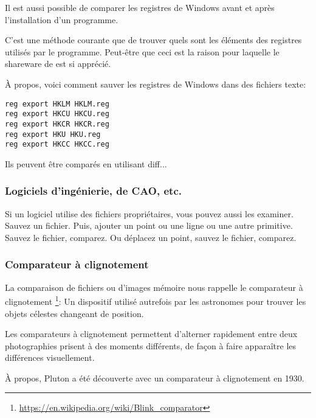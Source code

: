 Il est aussi possible de comparer les registres de Windows avant et après l'installation
d'un programme.

C'est une méthode courante  que de trouver quels sont les éléments des registres
utilisés par le programme. Peut-être que ceci est la raison pour laquelle le shareware
de  est si apprécié.

À propos, voici comment sauver les registres de Windows dans des fichiers texte:

\begin{lstlisting}
reg export HKLM HKLM.reg
reg export HKCU HKCU.reg
reg export HKCR HKCR.reg
reg export HKU HKU.reg
reg export HKCC HKCC.reg
\end{lstlisting}

Ils peuvent être comparés en utilisant diff...

\subsubsection{Logiciels d'ingénierie, de CAO, etc.}

Si un logiciel utilise des fichiers propriétaires, vous pouvez aussi les examiner.
Sauvez un fichier.
Puis, ajouter un point ou une ligne ou une autre primitive.
Sauvez le fichier, comparez.
Ou déplacez un point, sauvez le fichier, comparez.

\subsubsection{Comparateur à clignotement}

La comparaison de fichiers ou d'images mémoire nous rappelle le comparateur à clignotement
\footnote{\url{https://en.wikipedia.org/wiki/Blink_comparator}}:
Un dispositif utilisé autrefois par les astronomes pour trouver les objets célestes
changeant de position.

Les comparateurs à clignotement permettent d'alterner rapidement entre deux photographies
prisent à des moments différents, de façon à faire apparaître les différences visuellement.

À propos, Pluton a été découverte avec un comparateur à clignotement en 1930.
